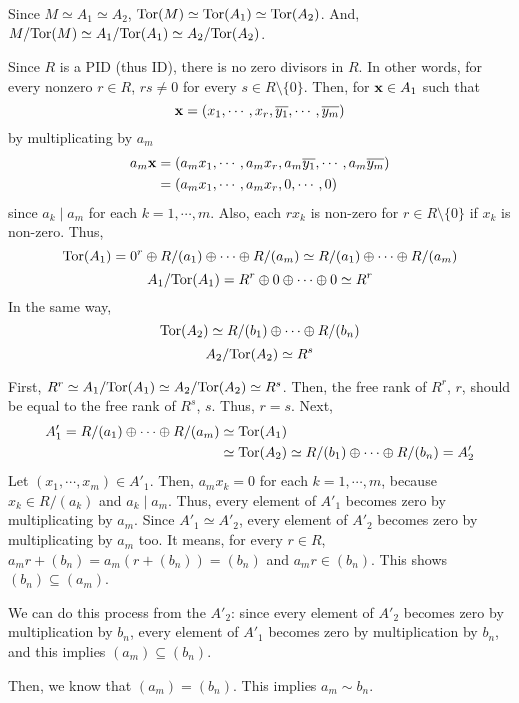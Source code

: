 Since \(M \simeq A_1 \simeq A_2\),
\(\textnormal{Tor}(M) \simeq \textnormal{Tor}(A_1) \simeq \textnormal{Tor}(A_2)\).
And, \(M/\textnormal{Tor}(M) \simeq A_1 / \textnormal{Tor}(A_1) \simeq A_2 / \textnormal{Tor}(A_2)\).

Since \(R\) is a PID (thus ID), there is no zero divisors in \(R\).
In other words, for every nonzero \(r \in R\), \(rs \neq 0\) for every \(s \in R \setminus \{0\}\).
Then, for \(\mathbf{x} \in A_1\) such that
\[\mathbf{x} = (x_1, \cdots, x_r, \overline{y_1}, \cdots, \overline{y_m})\]
by multiplicating by \(a_m\)
\begin{align*}
  a_m\mathbf{x}
  &= (a_m x_1, \cdots, a_m x_r, a_m\overline{y_1}, \cdots, a_m\overline{y_m})
  \\&= (a_m x_1, \cdots, a_m x_r, 0, \cdots, 0)
\end{align*}
since \(a_k \mid a_m\) for each \(k = 1, \cdots, m\).
Also, each \(r x_k\) is non-zero for \(r \in R \setminus \{0\}\) if \(x_k\) is non-zero.
Thus,
\[\textnormal{Tor}(A_1)
  = 0^r \oplus R/(a_1) \oplus \cdots \oplus R/(a_m)
  \simeq R/(a_1) \oplus \cdots \oplus R/(a_m)\]
\[A_1 / \textnormal{Tor}(A_1)
  = R^r \oplus 0 \oplus \cdots \oplus 0
  \simeq R^r\]
In the same way,
\[\textnormal{Tor}(A_2) \simeq R/(b_1) \oplus \cdots \oplus R/(b_n) \]
\[A_2 / \textnormal{Tor}(A_2) \simeq R^s\]

First, \(R^r \simeq A_1 / \textnormal{Tor}(A_1) \simeq A_2 / \textnormal{Tor}(A_2) \simeq R^s\).
Then, the free rank of \(R^r\), \(r\), should be equal to
the free rank of \(R^s\), \(s\).
Thus, \(r = s\).
\br
\noindent
Next,
\begin{align*}
  A'_1 = R/(a_1) \oplus \cdots \oplus R/(a_m)
  &\simeq \textnormal{Tor}(A_1)
  \\&\simeq \textnormal{Tor}(A_2)
  \simeq R/(b_1) \oplus \cdots \oplus R/(b_n) = A'_2
\end{align*}
Let \((x_1, \cdots, x_m) \in A'_1\).
Then, \(a_m x_k = 0\) for each \(k = 1, \cdots, m\), because \(x_k \in R/(a_k)\) and \(a_k \mid a_m\).
Thus, every element of \(A'_1\) becomes zero by multiplicating by \(a_m\).
Since \(A'_1 \simeq A'_2\), every element of \(A'_2\) becomes zero by multiplicating by \(a_m\) too.
It means, for every \(r \in R\),
\(a_m r + (b_n) = a_m(r + (b_n)) = (b_n)\)
and \(a_m r \in (b_n)\).
This shows \((b_n) \subseteq (a_m)\).

We can do this process from the \(A'_2\):
since every element of \(A'_2\) becomes zero by multiplication by \(b_n\),
every element of \(A'_1\) becomes zero by multiplication by \(b_n\),
and this implies \((a_m) \subseteq (b_n)\).

Then, we know that \((a_m) = (b_n)\). This implies \(a_m \sim b_n\).

